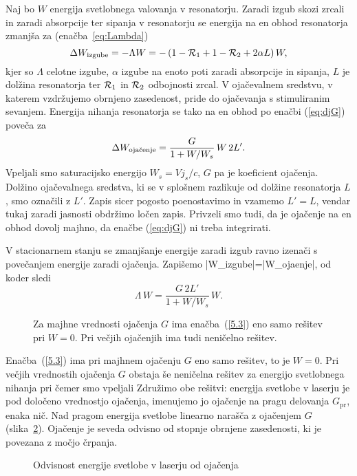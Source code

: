 Naj bo $W$ energija svetlobnega valovanja v resonatorju. Zaradi izgub skozi
zrcali in zaradi absorpcije ter sipanja v resonatorju se energija na en obhod 
resonatorja zmanjša za (enačba~\ref{eq:Lambda})
\begin{equation}
\Delta W_{\rm izgube}=-\Lambda W=-\left(1-{\cal {R}}_{1}+1-{\cal {R}}_{2}
+2\alpha L\right)W,
\label{5.1}
\end{equation}
kjer so $\Lambda $ celotne izgube, $\alpha$ izgube na enoto poti zaradi
absorpcije in sipanja, $L$ je dolžina resonatorja ter 
${\cal {R}}_{1}$ in ${\cal {R}}_{2}$ odbojnosti
zrcal. V ojačevalnem sredstvu, v katerem vzdržujemo obrnjeno zasedenost,
pride do ojačevanja s stimuliranim sevanjem. Energija nihanja resonatorja 
se tako na en obhod po enačbi (\ref{eq:djG}) poveča za 
\begin{equation}  
\Delta W_{\rm oja\check{c}enje}=\frac{G}{1+W/W_s}\,W\, 2L'.
\label{5.2}
\end{equation}
Vpeljali smo saturacijsko energijo $W_s=Vj_s/c$, $G$ pa je koeficient ojačenja.
Dolžino ojačevalnega sredstva,
ki se v splošnem razlikuje od dolžine resonatorja $L$, smo označili z $L'$.
Zapis sicer pogosto poenostavimo in vzamemo $L'=L$, vendar tukaj zaradi
jasnosti obdržimo ločen zapis. Privzeli smo tudi, da je ojačenje na en
obhod dovolj majhno, da enačbe (\ref{eq:djG}) ni treba integrirati.

V stacionarnem stanju se zmanjšanje energije zaradi izgub ravno izenači 
s povečanjem energije zaradi ojačenja. Zapišemo
\beq
|\Delta W_{\rm izgube}|=|\Delta W_{\rm ojaenje}|,
\eeq
od koder sledi
\begin{equation}  
\Lambda\, W=\frac{G\,2L'}{1+W/W_s}\,W.
\label{5.3}
\end{equation}
\begin{figure}[h]
\centering
\def\svgwidth{140truemm} 

\caption{Za majhne vrednosti ojačenja $G$ ima enačba~(\ref{5.3}) eno samo 
rešitev pri $W=0$. Pri večjih ojačenjih ima tudi neničelno rešitev.}
\label{fig:stacio}
\end{figure}

Enačba~(\ref{5.3}) ima pri majhnem ojačenju $G$ eno samo rešitev, to je 
$W=0$. Pri večjih vrednostih ojačenja $G$ obstaja še neničelna rešitev
za energijo svetlobnega nihanja
pri čemer smo vpeljali
Združimo obe rešitvi: energija svetlobe v laserju je pod določeno
vrednostjo ojačenja, imenujemo jo ojačenje na pragu delovanja $G_\mathrm{pr}$, enaka
nič. Nad pragom energija svetlobe linearno narašča z ojačenjem $G$ (slika~\ref{fig:energija}).
Ojačenje je seveda odvisno od stopnje obrnjene zasedenosti, ki je povezana
z močjo črpanja.
\begin{figure}[h]
\centering
\def\svgwidth{60truemm} 

\caption{Odvisnost energije svetlobe v laserju od ojačenja}
\label{fig:energija}
\end{figure}

